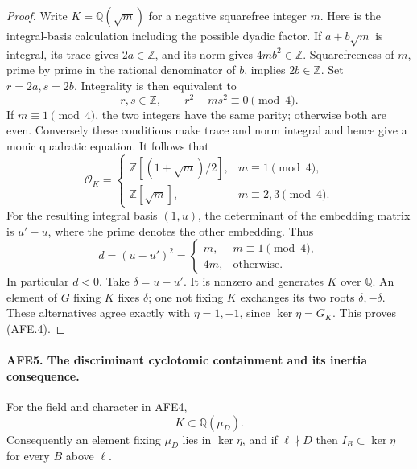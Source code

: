 \begin{proof}
Write \(K=\mathbb Q(\sqrt m)\) for a negative squarefree
integer \(m\).  Here is the integral-basis calculation
including the possible dyadic factor.
If \(a+b\sqrt m\) is integral, its trace gives
\(2a\in\mathbb Z\), and its norm gives
\(4mb^2\in\mathbb Z\).
Squarefreeness of \(m\), prime by prime in the rational
denominator of \(b\), implies \(2b\in\mathbb Z\).
Set \(r=2a,s=2b\).  Integrality is then equivalent to
\[
                  r,s\in\mathbb Z,\qquad
                  r^2-ms^2\equiv0\pmod4.
\]
If \(m\equiv1\pmod4\), the two integers have the same
parity; otherwise both are even.  Conversely these
conditions make trace and norm integral and hence give
a monic quadratic equation.  It follows that
\[
 \mathcal O_K=
 \begin{cases}
  \mathbb Z[(1+\sqrt m)/2],&m\equiv1\pmod4,\\
  \mathbb Z[\sqrt m],&m\equiv2,3\pmod4.
 \end{cases}
\]
For the resulting integral basis \((1,u)\), the determinant
of the embedding matrix is \(u'-u\), where the prime denotes
the other embedding.  Thus
\[
        d=(u-u')^2=
        \begin{cases}m,&m\equiv1\pmod4,\\4m,&\text{otherwise}.
        \end{cases}
\]
In particular \(d<0\).  Take \(\delta=u-u'\).
It is nonzero and generates \(K\) over \(\mathbb Q\).
An element of \(G\) fixing \(K\) fixes \(\delta\);
one not fixing \(K\) exchanges its two roots
\(\delta,-\delta\).
These alternatives agree exactly with
\(\eta=1,-1\), since \(\ker\eta=G_K\).
This proves (AFE.4).
\end{proof}

\paragraph{AFE5. The discriminant cyclotomic containment and its inertia consequence.}
\label{claim:AFE5}
For the field and character in AFE4,
\[
                  K\subset\mathbb Q(\mu_D).
                                                        \tag{AFE.5}
\]
Consequently an element fixing \(\mu_D\) lies in
\(\ker\eta\), and if \(\ell\nmid D\) then
\(I_B\subset\ker\eta\) for every \(B\) above \(\ell\).

